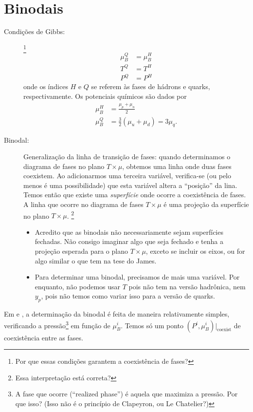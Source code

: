 \chapter{Binodais}

\begin{description}
\item[Condições de Gibbs:]\footnote{Por que essas condições garantem a coexistência de fases?}
\begin{align}
\mu_B^Q &= \mu_B^H \\
T^Q &= T^H \\
P^Q &= P^H
\end{align}
%
onde os índices $H$ e $Q$ se referem às fases de hádrons e quarks, respectivamente. Os potenciais químicos são dados por
\begin{align}
	\mu_B^H &= \frac{\mu_p + \mu_n}{2} \\
	\mu_B^Q &= \frac{3}{2} (\mu_u + \mu_d) = 3 \mu_q.
\end{align}

\item[Binodal:] Generalização da linha de transição de fases: quando determinamos o diagrama de fases no plano $T \times \mu$, obtemos uma linha onde duas fases coexistem. Ao adicionarmos uma terceira variável, verifica-se (ou pelo menos é uma possibilidade) que esta variável altera a ``posição'' da lina. Temos então que existe uma \emph{superfície} onde ocorre a coexistência de fases. A linha que ocorre no diagrama de fases $T \times \mu$ é uma projeção da superfície no plano $T \times \mu$. \footnote{Essa interpretação está correta?}
	\begin{itemize}
		\item Acredito que as binodais não necessariamente sejam superfícies fechadas. Não consigo imaginar algo que seja fechado e tenha a projeção esperada para o plano $T \times \mu$, exceto se incluir os eixos, ou for algo similar o que tem na tese do James.
		\item Para determinar uma binodal, precisamos de mais uma variável. Por enquanto, não podemos usar $T$ pois não tem na versão hadrônica, nem $y_p$, pois não temos como variar isso para a versão de quarks.
	\end{itemize}
\end{description}



Em \textcite{japoneses} e \textcite{japoneses2}, a determinação da binodal é feita de maneira relativamente simples, verificando a pressão\footnote{A fase que ocorre (``realized phase'') é aquela que maximiza a pressão. Por que isso? (Isso não é o princípio de Clapeyron, ou Le Chatelier?)} em função de $\mu_B^i$. Temos só um ponto $(P^i, \mu_B^i)|_{\textrm{coexist}}$ de coexistência entre as fases.


